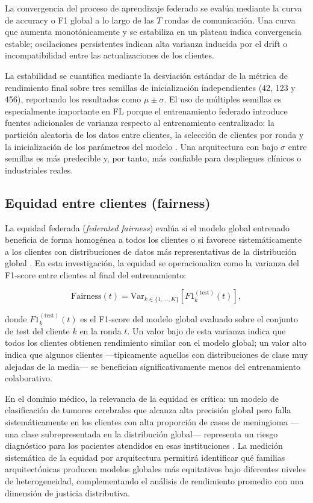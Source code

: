 La convergencia del proceso de aprendizaje federado se evalúa mediante la curva de accuracy o
F1 global a lo largo de las $T$ rondas de comunicación. Una curva que aumenta
monotónicamente y se estabiliza en un plateau indica convergencia estable; oscilaciones
persistentes indican alta varianza inducida por el drift o incompatibilidad entre las
actualizaciones de los clientes.

La estabilidad se cuantifica mediante la desviación estándar de la métrica de rendimiento final
sobre tres semillas de inicialización independientes (42, 123 y 456), reportando los resultados
como $\mu \pm \sigma$. El uso de múltiples semillas es especialmente importante en FL porque el
entrenamiento federado introduce fuentes adicionales de varianza respecto al entrenamiento
centralizado: la partición aleatoria de los datos entre clientes, la selección de clientes por
ronda y la inicialización de los parámetros del modelo \cite{DBLP:journals/corr/abs-1912-04977}.
Una arquitectura con bajo $\sigma$ entre semillas es más predecible y, por tanto, más confiable
para despliegues clínicos o industriales reales.

\subsection{Equidad entre clientes (fairness)}

La equidad federada (\textit{federated fairness}) evalúa si el modelo global entrenado
beneficia de forma homogénea a todos los clientes o si favorece sistemáticamente a los clientes
con distribuciones de datos más representativas de la distribución global
\cite{DBLP:journals/corr/abs-1912-04977}. En esta investigación, la equidad se operacionaliza
como la varianza del F1-score entre clientes al final del entrenamiento:

\begin{equation}
  \text{Fairness}(t) = \text{Var}_{k \in \{1, \ldots, K\}}\!\left[
    F1_k^{(\text{test})}(t)
  \right],
  \label{eq:fairness}
\end{equation}

donde $F1_k^{(\text{test})}(t)$ es el F1-score del modelo global evaluado sobre el conjunto de
test del cliente $k$ en la ronda $t$. Un valor bajo de esta varianza indica que todos los
clientes obtienen rendimiento similar con el modelo global; un valor alto indica que algunos
clientes —típicamente aquellos con distribuciones de clase muy alejadas de la media— se
benefician significativamente menos del entrenamiento colaborativo.

En el dominio médico, la relevancia de la equidad es crítica: un modelo de clasificación de
tumores cerebrales que alcanza alta precisión global pero falla sistemáticamente en los clientes
con alta proporción de casos de meningioma —una clase subrepresentada en la distribución
global— representa un riesgo diagnóstico para los pacientes atendidos en esas instituciones
\cite{noor2026federated}. La medición sistemática de la equidad por arquitectura permitirá
identificar qué familias arquitectónicas producen modelos globales más equitativos bajo
diferentes niveles de heterogeneidad, complementando el análisis de rendimiento promedio con
una dimensión de justicia distributiva.


